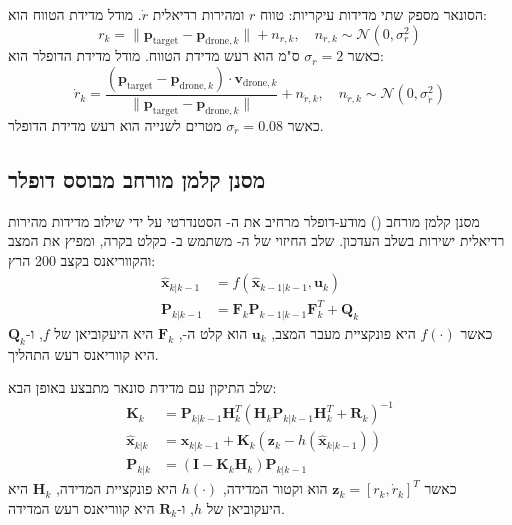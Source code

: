 הסונאר מספק שתי מדידות עיקריות: טווח $r$ ומהירות רדיאלית $\dot{r}$. מודל מדידת הטווח הוא:
\begin{equation}
r_k = \| \mathbf{p}_{\text{target}} - \mathbf{p}_{\text{drone}, k} \| + n_{r,k}, \quad n_{r,k} \sim \mathcal{N}(0, \sigma_r^2)
\label{eq:ch05_range_model}
\end{equation}
כאשר $\sigma_r = 2$ ס"מ הוא רעש מדידת הטווח. מודל מדידת הדופלר הוא:
\begin{equation}
\dot{r}_k = \frac{(\mathbf{p}_{\text{target}} - \mathbf{p}_{\text{drone}, k}) \cdot \mathbf{v}_{\text{drone}, k}}{\| \mathbf{p}_{\text{target}} - \mathbf{p}_{\text{drone}, k} \|} + n_{\dot{r},k}, \quad n_{\dot{r},k} \sim \mathcal{N}(0, \sigma_{\dot{r}}^2)
\label{eq:ch05_doppler_model}
\end{equation}
כאשר $\sigma_{\dot{r}} = 0.08$ מטרים לשנייה הוא רעש מדידת הדופלר.

\subsection{מסנן קלמן מורחב מבוסס דופלר}
\label{sec:ch05_doppler_ekf}

מסנן קלמן מורחב () מודע-דופלר מרחיב את ה- הסטנדרטי על ידי שילוב מדידות מהירות רדיאלית ישירות בשלב העדכון. שלב החיזוי של ה- משתמש ב- כקלט בקרה, ומפיץ את המצב והקווריאנס בקצב 200 הרץ:
\begin{align}
\hat{\mathbf{x}}_{k|k-1} &= f(\hat{\mathbf{x}}_{k-1|k-1}, \mathbf{u}_k) \\
\mathbf{P}_{k|k-1} &= \mathbf{F}_k \mathbf{P}_{k-1|k-1} \mathbf{F}_k^T + \mathbf{Q}_k
\label{eq:ch05_ekf_prediction}
\end{align}
כאשר $f(\cdot)$ היא פונקציית מעבר המצב, $\mathbf{u}_k$ הוא קלט ה-, $\mathbf{F}_k$ היא היעקוביאן של $f$, ו-$\mathbf{Q}_k$ היא קווריאנס רעש התהליך.

שלב התיקון עם מדידת סונאר מתבצע באופן הבא:
\begin{align}
\mathbf{K}_k &= \mathbf{P}_{k|k-1} \mathbf{H}_k^T \left( \mathbf{H}_k \mathbf{P}_{k|k-1} \mathbf{H}_k^T + \mathbf{R}_k \right)^{-1} \\
\hat{\mathbf{x}}_{k|k} &= \hat{\mathbf{x}}_{k|k-1} + \mathbf{K}_k \left( \mathbf{z}_k - h(\hat{\mathbf{x}}_{k|k-1}) \right) \\
\mathbf{P}_{k|k} &= \left( \mathbf{I} - \mathbf{K}_k \mathbf{H}_k \right) \mathbf{P}_{k|k-1}
\label{eq:ch05_ekf_update}
\end{align}
כאשר $\mathbf{z}_k = [r_k, \dot{r}_k]^T$ הוא וקטור המדידה, $h(\cdot)$ היא פונקציית המדידה, $\mathbf{H}_k$ היא היעקוביאן של $h$, ו-$\mathbf{R}_k$ היא קווריאנס רעש המדידה.

